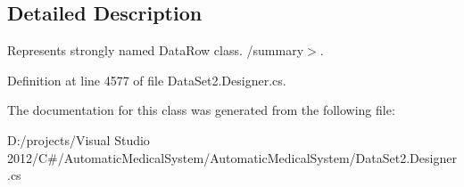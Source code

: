 \subsection{Detailed Description}
Represents strongly named DataRow class. /summary$>$. 

Definition at line 4577 of file DataSet2.Designer.cs.

The documentation for this class was generated from the following file:\begin{CompactItemize}
\item 
D:/projects/Visual Studio 2012/C\#/AutomaticMedicalSystem/AutomaticMedicalSystem/DataSet2.Designer.cs\end{CompactItemize}
